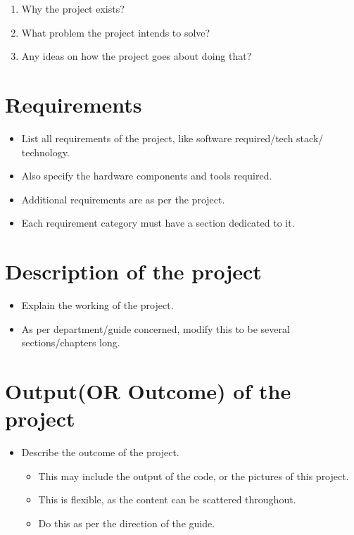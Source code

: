 \documentclass[
  12pt,
  a4paper,
  option1,
  option2]{book}
\providecommand{\tightlist}{%
  \setlength{\itemsep}{0pt}\setlength{\parskip}{0pt}}
\begin{document}
\begin{enumerate}
\def\labelenumi{\arabic{enumi}.}
\tightlist
\item
  Why the project exists?
\item
  What problem the project intends to solve?
\item
  Any ideas on how the project goes about doing that?
\end{enumerate}

\chapter{Requirements}\label{sec:Requirements}

\begin{itemize}
\item
  List all requirements of the project, like software required/tech
  stack/ technology.
\item
  Also specify the hardware components and tools required.
\item
  Additional requirements are as per the project.
\item
  Each requirement category must have a section dedicated to it.
\end{itemize}

\chapter{Description of the project}\label{sec:Project}

\begin{itemize}
\tightlist
\item
  Explain the working of the project.
\item
  As per department/guide concerned, modify this to be several
  sections/chapters long.
\end{itemize}

\chapter{Output(OR Outcome) of the project}\label{sec:Conclusion}

\begin{itemize}
\tightlist
\item
  Describe the outcome of the project.

  \begin{itemize}
  \tightlist
  \item
    This may include the output of the code, or the pictures of this
    project.
  \item
    This is flexible, as the content can be scattered throughout.
  \item
    Do this as per the direction of the guide.
  \end{itemize}
\end{itemize}
\end{document}

